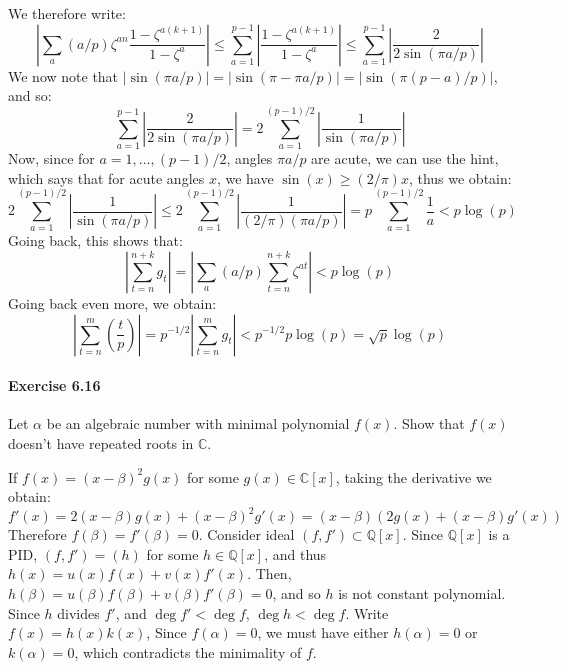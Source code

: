 \documentclass[notitlepage]{article}
\theoremstyle{definition}
\newcommand\C{\mathbb{C}}
\newcommand\Q{\mathbb{Q}}
\newcommand{\Jacobi}[2]{\left(\frac{#1}{#2}\right)}
\begin{document}
We therefore write:
\begin{equation}
  \left|\sum_a(a/p) \zeta^{an} \frac{1 - \zeta^{a(k+1)}}{1-\zeta^a}
  \right| \leq \sum_{a = 1}^{p-1} \left|\frac{1 -
    \zeta^{a(k+1)}}{1-\zeta^a}\right| \leq \sum_{a = 1}^{p-1}
  \left|\frac{2}{2 \sin(\pi a/p)}\right|
\end{equation}
We now note that $|\sin(\pi a/p)| = |\sin(\pi - \pi a/p)| = |\sin(\pi
(p-a)/p)|$, and so:
\begin{equation}
  \sum_{a = 1}^{p-1} \left|\frac{2}{2 \sin(\pi a/p)}\right| = 2
  \sum_{a = 1}^{(p-1)/2} \left|\frac{1}{\sin(\pi a/p)}\right|
\end{equation}
Now, since for $a = 1, \ldots, (p-1)/2$, angles $\pi a/p$ are acute,
we can use the hint, which says that for acute angles $x$, we have
$\sin(x) \geq (2/\pi) x$, thus we obtain:
\begin{equation}
  2 \sum_{a = 1}^{(p-1)/2} \left|\frac{1}{\sin(\pi a/p)}\right| \leq
  2 \sum_{a = 1}^{(p-1)/2} \left|\frac{1}{(2/\pi)(\pi a/p)}\right| = 
  p \sum_{a = 1}^{(p-1)/2} \frac{1}{a} < p \log(p)
\end{equation}
Going back, this shows that:
\begin{equation}
  \left|\sum_{t = n}^{n+k} g_t \right|
  = \left|\sum_a (a/p)\sum_{t = n}^{n+k} \zeta^{at} \right| < p \log(p)
\end{equation}
Going back even more, we obtain:
\begin{equation}
  \left|\sum_{t = n}^m \Jacobi{t}{p}\right| = p^{-1/2} \left|\sum_{t =
    n}^m g_t \right| < p^{-1/2} p \log(p) = \sqrt{p} \log(p)
\end{equation}

\paragraph{Exercise 6.16}
Let $\alpha$ be an algebraic number with minimal polynomial
$f(x)$. Show that $f(x)$ doesn't have repeated roots in $\mathbb{C}$.

If $f(x) = (x-\beta)^2 g(x)$ for some $g(x) \in \C[x]$, taking the
derivative we obtain:
\begin{equation}
  f'(x) = 2(x-\beta) g(x) + (x-\beta)^2 g'(x) = (x-\beta)(2 g(x) + (x-\beta)g'(x))
\end{equation}
Therefore $f(\beta) = f'(\beta) = 0$. Consider ideal $(f, f') \subset
\Q[x]$. Since $\Q[x]$ is a PID, $(f, f') = (h)$ for some $h \in
\Q[x]$, and thus $h(x) = u(x) f(x) + v(x) f'(x)$. Then, $h(\beta) =
u(\beta) f(\beta) + v(\beta) f'(\beta) = 0$, and so $h$ is not
constant polynomial. Since $h$ divides $f'$, and $\deg f' < \deg f$,
$\deg h < \deg f$. Write $f(x) = h(x) k(x)$, Since $f(\alpha) = 0$, we
must have either $h(\alpha) = 0$ or $k(\alpha) = 0$, which contradicts
the minimality of $f$.
\end{document}

